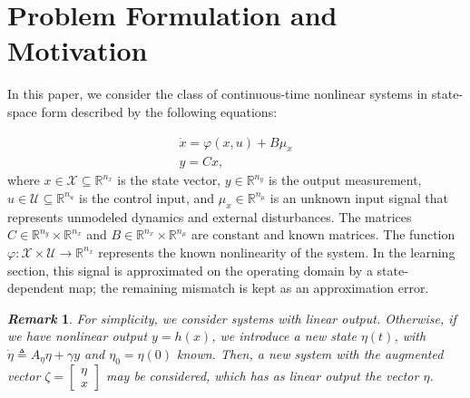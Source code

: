 \documentclass{ifacconf}
\newtheorem{remark}{\it \textbf{Remark}}%
\begin{document}








\section{Problem Formulation and Motivation}\label{sec2}
%
In this paper, we consider the class of continuous-time nonlinear systems in state-space form described by the following equations:

\begin{equation}\label{sys_1}
    \begin{array}{l}
        \dot{x} = \varphi(x,u) + B\mu_{x}  \\
        y = Cx, 
    \end{array}
\end{equation}
where $x\in \mathcal{X} \subseteq\mathbb{R}^{n_x}$ is the state vector, $y\in\mathbb{R}^{n_y}$ is the output measurement, $u\in\mathcal{U} \subseteq\mathbb{R}^{n_u}$ is the control input, and $\mu_{x}\in\mathbb{R}^{n_{\mu}}$ is an unknown input signal that represents unmodeled dynamics and external disturbances. The matrices $C\in\mathbb{R}^{n_y}\times\mathbb{R}^{n_x}$ and $B\in\mathbb{R}^{n_x}\times\mathbb{R}^{n_{\mu}}$ are constant and known matrices. The function $\varphi: \mathcal{X} \times \mathcal{U} \to \mathbb{R}^{n_x}$ represents the known nonlinearity of the system. In the learning section, this signal is approximated on the operating domain by a state-dependent map; the remaining mismatch is kept as an approximation error.

\begin{remark}
For simplicity, we consider systems with linear output. Otherwise, if we have nonlinear output $y = h(x)$, we introduce a new state $\eta(t)$, with $\dot{\eta} \triangleq A_{\eta} \eta + \gamma y$ and $\eta_0 = \eta(0)$ known. Then, a new system with the augmented vector $\zeta = \begin{bmatrix} \eta \\ x \end{bmatrix}$ may be considered, which has as linear output the vector $\eta$.
\end{remark}
\end{document}
